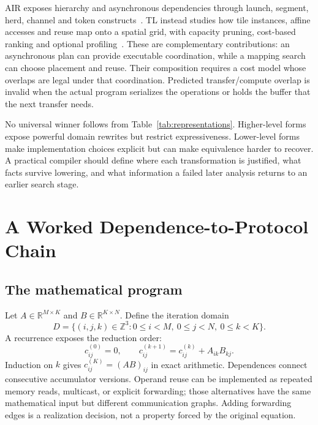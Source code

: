 \documentclass[final,3p,times,authoryear]{elsarticle}
\newcommand{\Z}{\mathbb{Z}}
\newcommand{\R}{\mathbb{R}}
\begin{document}
AIR exposes hierarchy and asynchronous dependencies through launch, segment, herd, channel and token constructs~\citep{wang2025air}. TL instead studies how tile instances, affine accesses and reuse map onto a spatial grid, with capacity pruning, cost-based ranking and optional profiling~\citep{li2025tl}. These are complementary contributions: an asynchronous plan can provide executable coordination, while a mapping search can choose placement and reuse. Their composition requires a cost model whose overlaps are legal under that coordination. Predicted transfer/compute overlap is invalid when the actual program serializes the operations or holds the buffer that the next transfer needs.

No universal winner follows from Table~\ref{tab:representations}. Higher-level forms expose powerful domain rewrites but restrict expressiveness. Lower-level forms make implementation choices explicit but can make equivalence harder to recover. A practical compiler should define where each transformation is justified, what facts survive lowering, and what information a failed later analysis returns to an earlier search stage.


\section{A Worked Dependence-to-Protocol Chain}\label{sec:gemm}
\subsection{The mathematical program}
Let $A\in\R^{M\times K}$ and $B\in\R^{K\times N}$. Define the iteration domain
\begin{equation}
 D=\{(i,j,k)\in\Z^3:0\le i<M,\ 0\le j<N,\ 0\le k<K\}.
\end{equation}
A recurrence exposes the reduction order:
\begin{equation}\label{eq:gemm}
 c_{ij}^{(0)}=0,\qquad c_{ij}^{(k+1)}=c_{ij}^{(k)}+A_{ik}B_{kj}.
\end{equation}
Induction on $k$ gives $c_{ij}^{(K)}=(AB)_{ij}$ in exact arithmetic. Dependences connect consecutive accumulator versions. Operand reuse can be implemented as repeated memory reads, multicast, or explicit forwarding; those alternatives have the same mathematical input but different communication graphs. Adding forwarding edges is a realization decision, not a property forced by the original equation.
\end{document}
